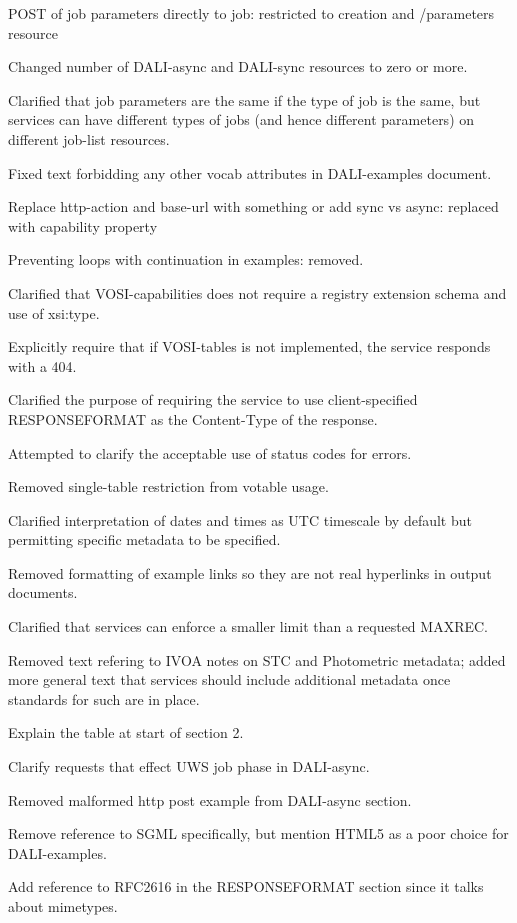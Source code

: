 \documentclass[11pt,letter]{ivoa}
\begin{document}
POST of job parameters directly to job: restricted to creation and /parameters 
resource

Changed number of DALI-async and DALI-sync resources to zero or more.

Clarified that job parameters are the same if the type of job is the same, but 
services can have different types of jobs (and hence different parameters) on 
different job-list resources.

Fixed text forbidding any other vocab attributes in DALI-examples document.

Replace http-action and base-url with something or add sync vs async: replaced 
with capability property

Preventing loops with continuation in examples: removed.

Clarified that VOSI-capabilities does not require a registry extension schema 
and use of xsi:type.

Explicitly require that if VOSI-tables is not implemented, the service responds 
with a 404.

Clarified the purpose of requiring the service to use client-specified 
RESPONSEFORMAT as the Content-Type of the response.

Attempted to clarify the acceptable use of status codes for errors.

Removed single-table restriction from votable usage.

Clarified interpretation of dates and times as UTC timescale by default but 
permitting specific metadata to be specified.

Removed formatting of example links so they are not real hyperlinks in output 
documents.

Clarified that services can enforce a smaller limit than a requested MAXREC.

Removed text refering to IVOA notes on STC and Photometric metadata; added more 
general text that services should include additional metadata once standards for 
such are in place.

Explain the table at start of section 2.

Clarify requests that effect UWS job phase in DALI-async.

Removed malformed http post example from DALI-async section.

Remove reference to SGML specifically, but mention HTML5 as a poor choice for 
DALI-examples.

Add reference to RFC2616 in the RESPONSEFORMAT section since it talks about 
mimetypes.
\end{document}
